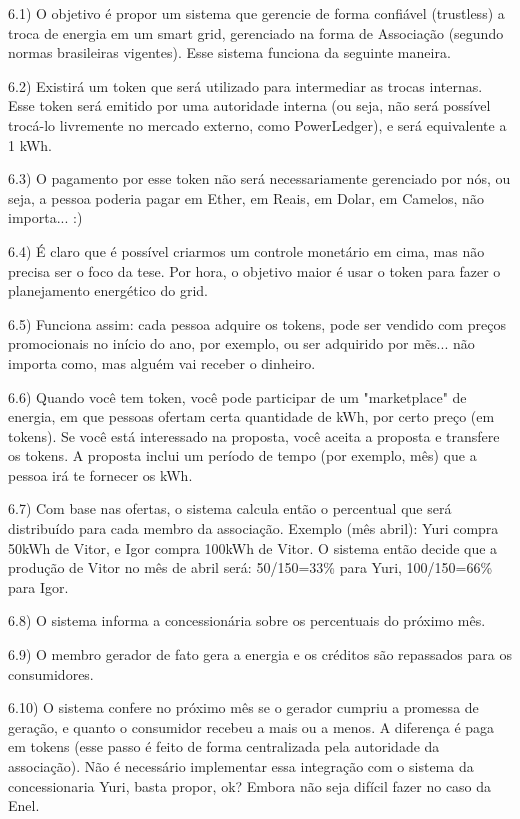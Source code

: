 6.1) O objetivo é propor um sistema que gerencie de forma confiável (trustless) a troca de energia em um smart grid, gerenciado na forma de Associação (segundo normas brasileiras vigentes). Esse sistema funciona da seguinte maneira.

6.2) Existirá um token que será utilizado para intermediar as trocas internas. Esse token será emitido por uma autoridade interna (ou seja, não será possível trocá-lo livremente no mercado externo, como PowerLedger), e será equivalente a 1 kWh.

6.3) O pagamento por esse token não será necessariamente gerenciado por nós, ou seja, a pessoa poderia pagar em Ether, em Reais, em Dolar, em Camelos, não importa... :) 

6.4) É claro que é possível criarmos um controle monetário em cima, mas não precisa ser o foco da tese. Por hora, o objetivo maior é usar o token para fazer o planejamento energético do grid.

6.5) Funciona assim: cada pessoa adquire os tokens, pode ser vendido com preços promocionais no início do ano, por exemplo, ou ser adquirido por mẽs... não importa como, mas alguém vai receber o dinheiro.

6.6) Quando você tem token, você pode participar de um "marketplace" de energia, em que pessoas ofertam certa quantidade de kWh, por certo preço (em tokens). Se você está interessado na proposta, você aceita a proposta e transfere os tokens. A proposta inclui um período de tempo (por exemplo, mês) que a pessoa irá te fornecer os kWh.

6.7) Com base nas ofertas, o sistema calcula então o percentual que será distribuído para cada membro da associação. Exemplo (mês abril): Yuri compra 50kWh de Vitor, e Igor compra 100kWh de Vitor. O sistema então decide que a produção de Vitor no mês de abril será: 50/150=33\% para Yuri, 100/150=66\% para Igor.

6.8) O sistema informa a concessionária sobre os percentuais do próximo mês.

6.9) O membro gerador de fato gera a energia e os créditos são repassados para os consumidores.

6.10) O sistema confere no próximo mês se o gerador cumpriu a promessa de geração, e quanto o consumidor recebeu a mais ou a menos. A diferença é paga em tokens (esse passo é feito de forma centralizada pela autoridade da associação). Não é necessário implementar essa integração com o sistema da concessionaria Yuri, basta propor, ok? Embora não seja difícil fazer no caso da Enel.


